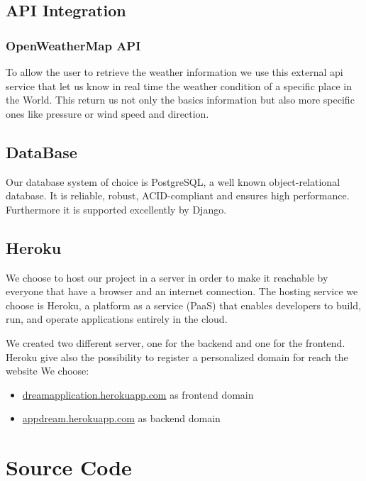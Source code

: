 \documentclass[table, 12pt]{article}
\begin{document}
\subsection{API Integration}
\subsubsection{OpenWeatherMap API}
To allow the user to retrieve the weather information we use this external api service that let us know in real time
the weather condition of a specific place in the World.
This return us not only the basics information but also more specific ones like pressure or wind speed and direction.

\subsection{DataBase}
Our database system of choice is PostgreSQL, a well known object-relational database. It is reliable, robust, ACID-compliant and ensures high performance. 
Furthermore it is supported excellently by Django.

\subsection{Heroku}
We choose to host our project in a server in order to make it reachable by everyone
that have a browser and an internet connection.
The hosting service we choose is Heroku, a platform as a service (PaaS)
that enables developers to build, run, and operate applications entirely
in the cloud.

We created two different server, one for the backend and one for the frontend.
Heroku give also the possibility to register a personalized domain for reach the
website
We choose:
\begin{itemize}
    \item \url{dreamapplication.herokuapp.com} as frontend domain
    \item \url{appdream.herokuapp.com} as backend domain
\end{itemize}



\section{Source Code}
\end{document}
